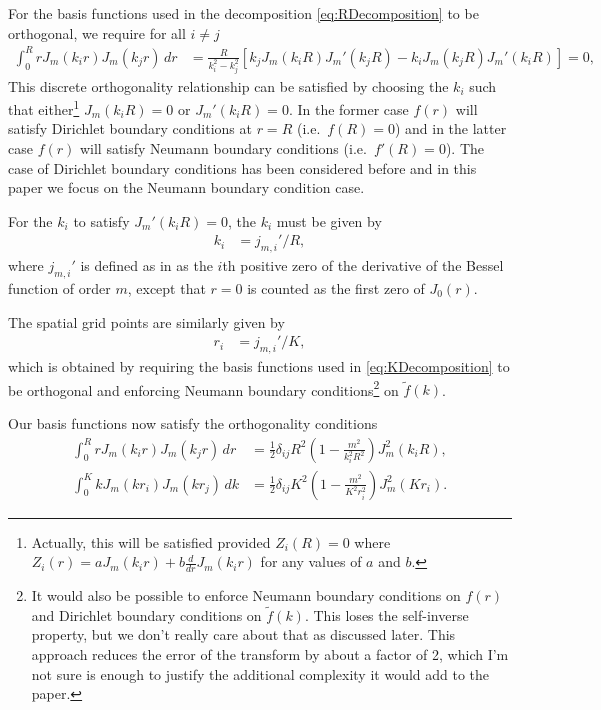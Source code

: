 \documentclass[aip,amsmath,amssymb,reprint,twocolumn]{revtex4-1}
\begin{document}
\begin{widetext}
For the basis functions used in the decomposition \eqref{eq:RDecomposition} to be orthogonal, we require for all $i \neq j$
\begin{align}
  \int_0^{R} r J_m(k_i r) J_m(k_j r)\, dr &= \frac{R}{k_i^2-k_j^2} \left[k_j J_m(k_i R) J_m'(k_j R) - k_i J_m(k_j R) J_m'(k_i R)\right] = 0, \label{eq:DiscreteROrthogonality}
\end{align}
This discrete orthogonality relationship can be satisfied by choosing the $k_i$ such that either\footnote{Actually, this will be satisfied provided $Z_i(R)=0$ where $Z_i(r) = a J_m(k_i r) + b \frac{d}{dr} J_m(k_i r)$ for any values of $a$ and $b$.} $J_m(k_i R) = 0$ or $J_m'(k_i R) = 0$.  In the former case $f(r)$ will satisfy Dirichlet boundary conditions at $r=R$ (i.e.\ $f(R) = 0$) and in the latter case $f(r)$ will satisfy Neumann boundary conditions (i.e.\ $f'(R) = 0$).  The case of Dirichlet boundary conditions has been considered before \citep{Yu:1998,Guizar-Sicairos:2004} and in this paper we focus on the Neumann boundary condition case.
\end{widetext}

For the $k_i$ to satisfy $J_m'(k_i R) = 0$, the $k_i$ must be given by
\begin{align}
  k_i &= j_{m,i}'/R,
\end{align}
where $j_{m,i}'$ is defined as in \citet{Abramowitz:1972} as the $i$th positive zero of the derivative of the Bessel function of order $m$, except that $r=0$ is counted as the first zero of $J_0(r)$.

The spatial grid points are similarly given by
\begin{align}
  r_i &= j_{m,i}'/K,
\end{align}
which is obtained by requiring the basis functions used in \eqref{eq:KDecomposition} to be orthogonal and enforcing Neumann boundary conditions\footnote{It would also be possible to enforce Neumann boundary conditions on $f(r)$ and Dirichlet boundary conditions on $\tilde{f}(k)$.  This loses the self-inverse property, but we don't really care about that as discussed later.  This approach reduces the error of the transform by about a factor of 2, which I'm not sure is enough to justify the additional complexity it would add to the paper.} on $\tilde{f}(k)$.  

Our basis functions now satisfy the orthogonality conditions
\begin{align}
  \int_0^R r J_m(k_i r) J_m(k_j r)\, dr &= \frac{1}{2} \delta_{ij} R^2 \left(1 - \frac{m^2}{k_i^2 R^2}\right) J_m^2(k_i R), \label{eq:DiscreteROrthogonalityCondition}\\
  \int_0^K k J_m(k r_i) J_m(k r_j)\, dk &= \frac{1}{2} \delta_{ij} K^2 \left(1 - \frac{m^2}{K^2 r_i^2}\right) J_m^2(K r_i). \label{eq:DiscreteKOrthogonalityCondition}
\end{align}
\end{document}
